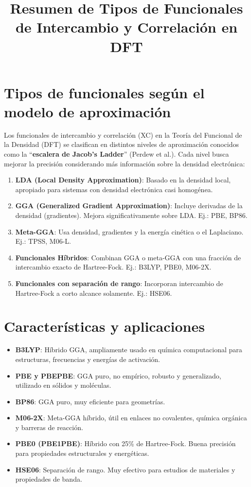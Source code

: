 \documentclass{article}
\title{Resumen de Tipos de Funcionales de Intercambio y Correlación en DFT}
\author{}
\date{}
\begin{document}
\maketitle

\section{\textbf{Tipos de funcionales según el modelo de aproximación}}

Los funcionales de intercambio y correlación (XC) en la Teoría del Funcional de la Densidad (DFT) se clasifican en distintos niveles de aproximación conocidos como la ``\textbf{escalera de Jacob's Ladder}'' (Perdew et al.). Cada nivel busca mejorar la precisión considerando más información sobre la densidad electrónica:

\begin{enumerate}[label=\textbf{\arabic*.}]
  \item \textbf{LDA (Local Density Approximation)}: Basado en la densidad local, apropiado para sistemas con densidad electrónica casi homogénea.
  \item \textbf{GGA (Generalized Gradient Approximation)}: Incluye derivadas de la densidad (gradientes). Mejora significativamente sobre LDA. Ej.: PBE, BP86.
  \item \textbf{Meta-GGA}: Usa densidad, gradientes y la energía cinética o el Laplaciano. Ej.: TPSS, M06-L.
  \item \textbf{Funcionales Híbridos}: Combinan GGA o meta-GGA con una fracción de intercambio exacto de Hartree-Fock. Ej.: B3LYP, PBE0, M06-2X.
  \item \textbf{Funcionales con separación de rango}: Incorporan intercambio de Hartree-Fock a corto alcance solamente. Ej.: HSE06.
\end{enumerate}

\section{Características y aplicaciones}

\begin{itemize}
  \item \textbf{B3LYP}: Híbrido GGA, ampliamente usado en química computacional para estructuras, frecuencias y energías de activación.
  \item \textbf{PBE y PBEPBE}: GGA puro, no empírico, robusto y generalizado, utilizado en sólidos y moléculas.
  \item \textbf{BP86}: GGA puro, muy eficiente para geometrías.
  \item \textbf{M06-2X}: Meta-GGA híbrido, útil en enlaces no covalentes, química orgánica y barreras de reacción.
  \item \textbf{PBE0 (PBE1PBE)}: Híbrido con 25\% de Hartree-Fock. Buena precisión para propiedades estructurales y energéticas.
  \item \textbf{HSE06}: Separación de rango. Muy efectivo para estudios de materiales y propiedades de banda.
\end{itemize}
\end{document}
